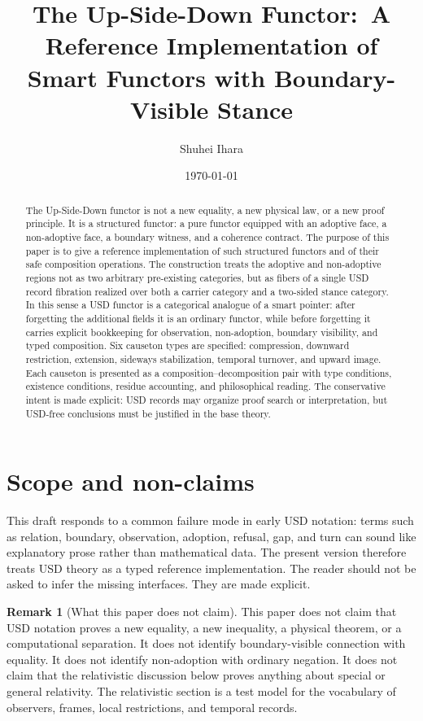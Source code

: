 \documentclass[11pt]{article}
\title{The Up-Side-Down Functor:\
A Reference Implementation of Smart Functors with Boundary-Visible Stance}
\author{Shuhei Ihara}
\date{\today}
\theoremstyle{definition}
\newtheorem{remark}[definition]{Remark}
\theoremstyle{plain}
\begin{document}
\maketitle

\begin{abstract}
The Up-Side-Down functor is not a new equality, a new physical law, or a new
proof principle.  It is a structured functor: a pure functor equipped
with an adoptive face, a non-adoptive face, a boundary witness, and a
coherence contract.  The purpose of this paper is to give a reference
implementation of such structured functors and of their safe composition
operations.  The construction treats the adoptive and non-adoptive
regions not as two arbitrary pre-existing categories, but as fibers of a
single USD record fibration realized over both a carrier category and a
two-sided stance category.  In this
sense a USD functor is a categorical analogue of a smart pointer: after
forgetting the additional fields it is an ordinary functor, while before
forgetting it carries explicit bookkeeping for observation, non-adoption,
boundary visibility, and typed composition.  Six causeton types are
specified: compression, downward restriction, extension, sideways
stabilization, temporal turnover, and upward image.  Each causeton is
presented as a composition--decomposition pair with type conditions,
existence conditions, residue accounting, and philosophical reading.  The
conservative intent is made explicit: USD records may organize proof
search or interpretation, but USD-free conclusions must be justified in
the base theory.
\end{abstract}

\tableofcontents

\section{Scope and non-claims}

This draft responds to a common failure mode in early USD notation: terms
such as relation, boundary, observation, adoption, refusal, gap, and turn
can sound like explanatory prose rather than mathematical data.  The
present version therefore treats USD theory as a typed reference
implementation.  The reader should not be asked to infer the missing
interfaces.  They are made explicit.

\begin{remark}[What this paper does not claim]
This paper does not claim that USD notation proves a new equality, a new
inequality, a physical theorem, or a computational separation.  It does
not identify boundary-visible connection with equality.  It does not
identify non-adoption with ordinary negation.  It does not claim that the
relativistic discussion below proves anything about special or general
relativity.  The relativistic section is a test model for the vocabulary
of observers, frames, local restrictions, and temporal records.
\end{remark}
\end{document}
